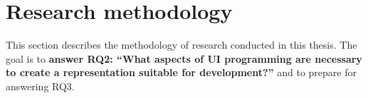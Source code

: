 \chapter{Research methodology}\label{ch:research-methodology}

This section describes the methodology of research conducted in this thesis.
The goal is to \textbf{answer RQ2: \enquote{What aspects of UI programming are necessary to create a representation suitable for development?}} and to prepare for answering RQ3.





